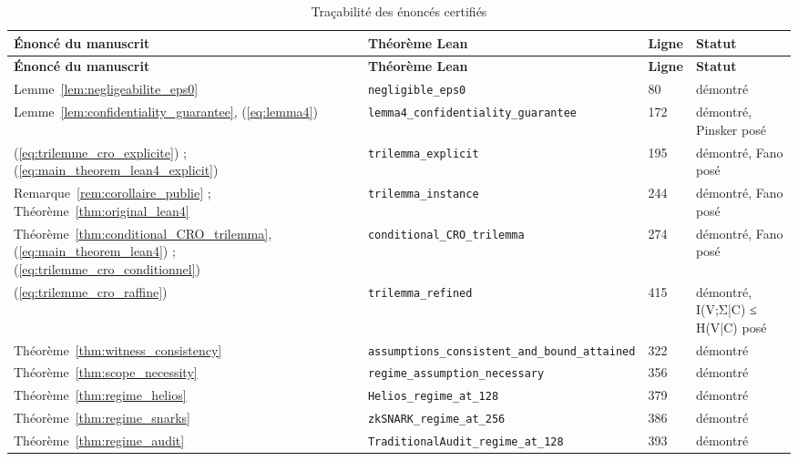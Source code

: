 {\footnotesize
\begin{longtable}{@{}p{4.6cm}p{5.2cm}p{0.9cm}>{\raggedright\arraybackslash}p{3.6cm}@{}}
\caption{Tra\c{c}abilit\'e des \'enonc\'es certifi\'es}\label{tab:lean4_tracabilite}\\
\toprule
\textbf{\'Enonc\'e du manuscrit} & \textbf{Th\'eor\`eme Lean} & \textbf{Ligne} & \textbf{Statut} \\
\midrule
\endfirsthead
\toprule
\textbf{\'Enonc\'e du manuscrit} & \textbf{Th\'eor\`eme Lean} & \textbf{Ligne} & \textbf{Statut} \\
\midrule
\endhead
\bottomrule
\endfoot
Lemme~\ref{lem:negligeabilite_eps0} & \texttt{negligible\_\allowbreak{}eps0} & 80 & démontré \\
Lemme~\ref{lem:confidentiality_guarantee}, (\ref{eq:lemma4}) & \texttt{lemma4\_\allowbreak{}confidentiality\_\allowbreak{}guarantee} & 172 & démontré, Pinsker posé \\
(\ref{eq:trilemme_cro_explicite}) ; (\ref{eq:main_theorem_lean4_explicit}) & \texttt{trilemma\_\allowbreak{}explicit} & 195 & démontré, Fano posé \\
Remarque~\ref{rem:corollaire_publie} ; Théorème~\ref{thm:original_lean4} & \texttt{trilemma\_\allowbreak{}instance} & 244 & démontré, Fano posé \\
Théorème~\ref{thm:conditional_CRO_trilemma}, (\ref{eq:main_theorem_lean4}) ; (\ref{eq:trilemme_cro_conditionnel}) & \texttt{conditional\_\allowbreak{}CRO\_\allowbreak{}trilemma} & 274 & démontré, Fano posé \\
(\ref{eq:trilemme_cro_raffine}) & \texttt{trilemma\_\allowbreak{}refined} & 415 & démontré, I(V;Σ|C) ≤ H(V|C) posé \\
Théorème~\ref{thm:witness_consistency} & \texttt{assumptions\_\allowbreak{}consistent\_\allowbreak{}and\_\allowbreak{}bound\_\allowbreak{}attained} & 322 & démontré \\
Théorème~\ref{thm:scope_necessity} & \texttt{regime\_\allowbreak{}assumption\_\allowbreak{}necessary} & 356 & démontré \\
Théorème~\ref{thm:regime_helios} & \texttt{Helios\_\allowbreak{}regime\_\allowbreak{}at\_\allowbreak{}128} & 379 & démontré \\
Théorème~\ref{thm:regime_snarks} & \texttt{zkSNARK\_\allowbreak{}regime\_\allowbreak{}at\_\allowbreak{}256} & 386 & démontré \\
Théorème~\ref{thm:regime_audit} & \texttt{TraditionalAudit\_\allowbreak{}regime\_\allowbreak{}at\_\allowbreak{}128} & 393 & démontré \\

\end{longtable}}
